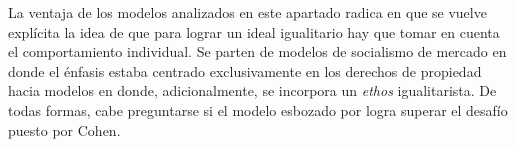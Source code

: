 La ventaja de los modelos analizados en este apartado radica en que se vuelve explícita la idea de que para lograr un ideal igualitario hay que tomar en cuenta el comportamiento individual. Se parten de modelos de socialismo de mercado en donde el énfasis estaba centrado exclusivamente en los derechos de propiedad hacia modelos en donde, adicionalmente, se incorpora un \textit{ethos} igualitarista. De todas formas, cabe preguntarse si el modelo esbozado por \citet{Roemer_2021a} logra superar el desafío puesto por Cohen.



